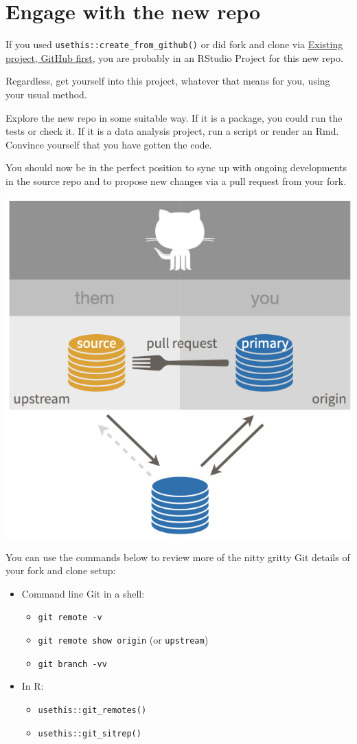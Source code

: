 \documentclass[
]{book}
\providecommand{\tightlist}{%
  \setlength{\itemsep}{0pt}\setlength{\parskip}{0pt}}
\begin{document}
\section{Engage with the new repo}\label{engage-with-the-new-repo}

If you used \texttt{usethis::create\_from\_github()} or did fork and clone via \hyperref[existing-github-first]{Existing project, GitHub first}, you are probably in an RStudio Project for this new repo.

Regardless, get yourself into this project, whatever that means for you, using your usual method.

Explore the new repo in some suitable way.
If it is a package, you could run the tests or check it.
If it is a data analysis project, run a script or render an Rmd.
Convince yourself that you have gotten the code.

You should now be in the perfect position to sync up with ongoing developments in the source repo and to propose new changes via a pull request from your fork.

\begin{center}\includegraphics[width=0.6\linewidth]{img/fork-them-pull-request} \end{center}

You can use the commands below to review more of the nitty gritty Git details of your fork and clone setup:

\begin{itemize}
\tightlist
\item
  Command line Git in a shell:

  \begin{itemize}
  \tightlist
  \item
    \texttt{git\ remote\ -v}
  \item
    \texttt{git\ remote\ show\ origin} (or \texttt{upstream})
  \item
    \texttt{git\ branch\ -vv}
  \end{itemize}
\item
  In R:

  \begin{itemize}
  \tightlist
  \item
    \texttt{usethis::git\_remotes()}
  \item
    \texttt{usethis::git\_sitrep()}
  \end{itemize}
\end{itemize}
\end{document}
